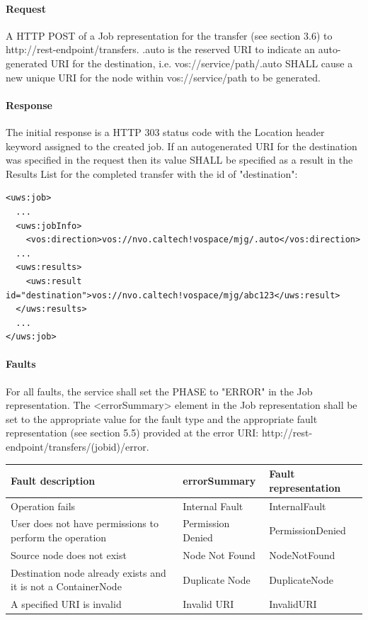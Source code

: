 \documentclass[11pt,a4paper]{ivoa}
\begin{document}
\paragraph{Request}
A HTTP POST of a Job representation for the transfer (see section 3.6) to http://rest-endpoint/transfers.
.auto is the reserved URI to indicate an auto-generated URI for the destination, i.e. vos://service/path/.auto SHALL cause a new unique URI for the node within vos://service/path to be generated.

\paragraph{Response}
The initial response is a HTTP 303 status code with the Location header keyword assigned to the created job.
If an autogenerated URI for the destination was specified in the request then its value SHALL be specified as a result in the Results List for the completed transfer with the id of "destination":

\begin{lstlisting}
<uws:job>
  ...
  <uws:jobInfo>
    <vos:direction>vos://nvo.caltech!vospace/mjg/.auto</vos:direction>
  ...
  <uws:results>
    <uws:result id="destination">vos://nvo.caltech!vospace/mjg/abc123</uws:result>
  </uws:results>
  ...
</uws:job>
\end{lstlisting}

\paragraph{Faults}
For all faults, the service shall set the PHASE to "ERROR" in the Job representation. The <errorSummary> element in the Job representation shall be set to the appropriate value for the fault type and the appropriate fault representation (see section 5.5) provided at the error URI: http://rest-endpoint/transfers/(jobid)/error.

\vspace{3mm}
\begin{tabular}{ p{5cm} l p{4cm} }
\textbf{Fault description} & \textbf{errorSummary} & \textbf{Fault representation} \\
\hline
Operation fails & Internal Fault & InternalFault \\
\hline
User does not have permissions to perform the operation & Permission Denied & PermissionDenied \\
\hline
Source node does not exist & Node Not Found & NodeNotFound \\
\hline
Destination node already exists and it is not a ContainerNode & Duplicate Node & DuplicateNode \\
\hline
A specified URI is invalid & Invalid URI & InvalidURI \\
\hline
\end{tabular}
\vspace{3mm}
\end{document}
